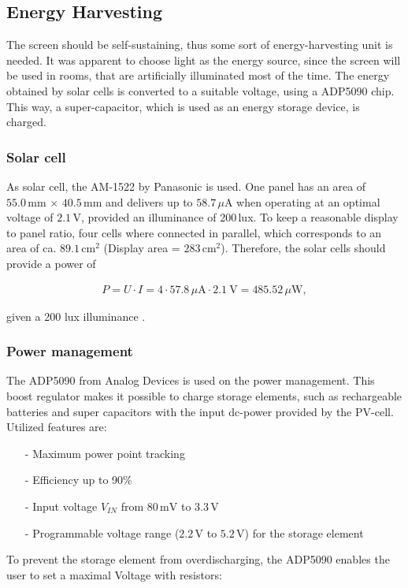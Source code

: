 \subsection{Energy Harvesting}
The screen should be self-sustaining, thus some sort of energy-harvesting unit is needed.
It was apparent to choose light as the energy source, since the screen will be used in rooms, that are artificially illuminated most of the time.
The energy  obtained by solar cells is converted to a suitable voltage, using a ADP5090 chip.
This way, a super-capacitor, which is used as an energy storage device, is charged.

\subsubsection{Solar cell}
As solar cell, the AM-1522 by Panasonic is used.
One panel has an area of $55.0\,\text{mm}\,\times\,40.5\,\text{mm}$ and delivers up to $58.7\, \mu\text{A}$ when operating at an optimal voltage of $2.1\,\text{V}$, provided an illuminance of 200\,lux.
To keep a reasonable display to panel ratio, four cells where connected in parallel, which corresponds to an area of ca. $89.1\,\text{cm}^2$ (Display area = $283\,\text{cm}^2$). Therefore, the solar cells should provide a power of

\begin{align}
	P = U\cdot I = 4\cdot 57.8\,\mu\text{A}\cdot 2.1\ \text{V}=485.52\,\mu \text{W},\label{development:cell_power}
\end{align}

given a 200 lux illuminance \cite{amorton}.

\subsubsection{Power management}
The ADP5090 from Analog Devices is used on the power management.
This boost regulator makes it possible to charge storage elements, such as rechargeable batteries and super capacitors with the input dc-power provided by the PV-cell. Utilized features are:
\begin{itemize}
	\item[-] Maximum power point tracking
	\item[-] Efficiency up to 90\%
	\item[-] Input voltage $V_{IN}$ from $80\,\text{mV}$ to $3.3\,\text{V}$
	\item[-] Programmable voltage range ($2.2\,\text{V}$ to $5.2\,\text{V}$) for the storage element
\end{itemize}
To prevent the storage element from overdischarging, the ADP5090 enables the user to set a maximal Voltage with resistors:

